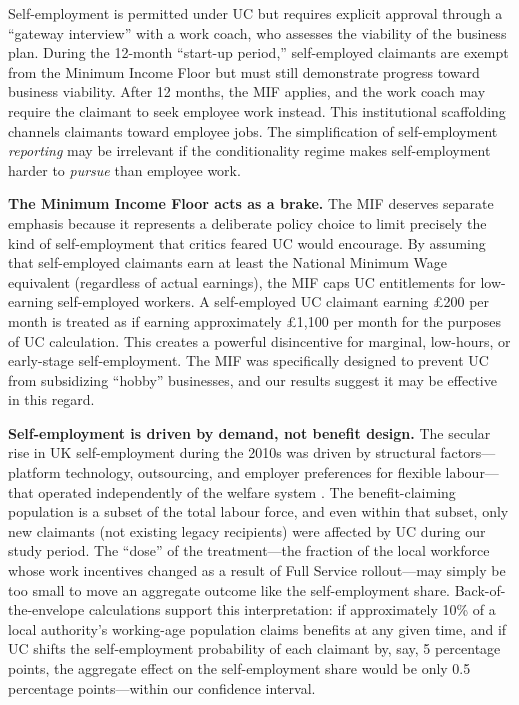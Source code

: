\documentclass[12pt]{article}
\begin{document}
Self-employment is permitted under UC but requires explicit approval through a ``gateway interview'' with a work coach, who assesses the viability of the business plan. During the 12-month ``start-up period,'' self-employed claimants are exempt from the Minimum Income Floor but must still demonstrate progress toward business viability. After 12 months, the MIF applies, and the work coach may require the claimant to seek employee work instead. This institutional scaffolding channels claimants toward employee jobs. The simplification of self-employment \textit{reporting} may be irrelevant if the conditionality regime makes self-employment harder to \textit{pursue} than employee work.

\textbf{The Minimum Income Floor acts as a brake.} The MIF deserves separate emphasis because it represents a deliberate policy choice to limit precisely the kind of self-employment that critics feared UC would encourage. By assuming that self-employed claimants earn at least the National Minimum Wage equivalent (regardless of actual earnings), the MIF caps UC entitlements for low-earning self-employed workers. A self-employed UC claimant earning \pounds 200 per month is treated as if earning approximately \pounds 1,100 per month for the purposes of UC calculation. This creates a powerful disincentive for marginal, low-hours, or early-stage self-employment. The MIF was specifically designed to prevent UC from subsidizing ``hobby'' businesses, and our results suggest it may be effective in this regard.

\textbf{Self-employment is driven by demand, not benefit design.} The secular rise in UK self-employment during the 2010s was driven by structural factors---platform technology, outsourcing, and employer preferences for flexible labour---that operated independently of the welfare system \citep{blundellSelfEmploymentLateCareer2022}. The benefit-claiming population is a subset of the total labour force, and even within that subset, only new claimants (not existing legacy recipients) were affected by UC during our study period. The ``dose'' of the treatment---the fraction of the local workforce whose work incentives changed as a result of Full Service rollout---may simply be too small to move an aggregate outcome like the self-employment share. Back-of-the-envelope calculations support this interpretation: if approximately 10\% of a local authority's working-age population claims benefits at any given time, and if UC shifts the self-employment probability of each claimant by, say, 5 percentage points, the aggregate effect on the self-employment share would be only 0.5 percentage points---within our confidence interval.
\end{document}
